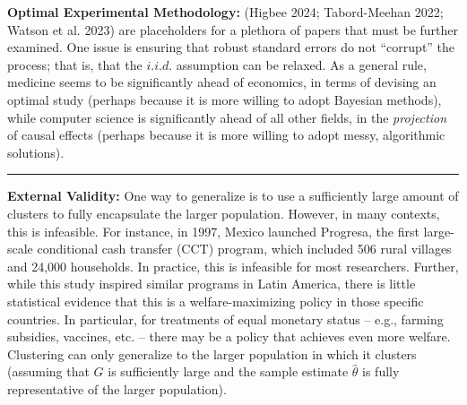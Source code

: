 \documentclass[12pt,letterpaper,doublespace, oneside]{article}
\begin{document}
\noindent\textbf{Optimal Experimental Methodology:} 
(Higbee 2024; Tabord-Meehan 2022; Watson et al. 2023) \cite{Higbee2024} \cite{TabordMeehan2023} \cite{Watson2023} are placeholders for a plethora of papers that must be further examined. One issue is ensuring that robust standard errors do not \enquote{corrupt} the process; that is, that the $i.i.d.$ assumption can be relaxed. As a general rule, medicine seems to be significantly ahead of economics, in terms of devising an optimal study (perhaps because it is more willing to adopt Bayesian methods), while computer science is significantly ahead of all other fields, in the \emph{projection} of causal effects (perhaps because it is more willing to adopt messy, algorithmic solutions). 

\noindent\rule{\linewidth}{0.4pt}


\noindent\textbf{External Validity:} 
One way to generalize is to use a sufficiently large amount of clusters to fully encapsulate the larger population. However, in many contexts, this is infeasible. For instance, in 1997, Mexico launched Progresa, the first large-scale conditional cash transfer (CCT) program, which included 506 rural villages and 24,000 households. In practice, this is infeasible for most researchers. Further, while this study inspired similar programs in Latin America, there is little statistical evidence that this is a welfare-maximizing policy in those specific countries. In particular, for treatments of equal monetary status -- e.g., farming subsidies, vaccines, etc. -- there may be a policy that achieves even more welfare. Clustering can only generalize to the larger population in which it clusters (assuming that $G$ is sufficiently large and the sample estimate $\hat{\theta}$ is fully representative of the larger population).
\end{document}
